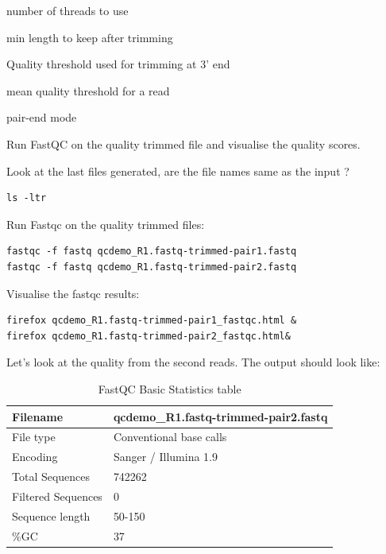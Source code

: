 \begin{note}
\begin{description}[style=multiline,labelindent=0cm,align=right,leftmargin=\descriptionlabelspace,rightmargin=1.5cm,font=\ttfamily]
\item[-t] number of threads to use
\item[-l] min length to keep after trimming
\item[-q] Quality threshold used for trimming at 3' end
\item[-Q] mean quality threshold for a read
\item[-m] pair-end mode
\end{description}
\end{note}

\begin{steps}
Run FastQC on the quality trimmed file and visualise the quality scores. 

Look at the last files generated, are the file names same as the input ?
\begin{lstlisting}
ls -ltr
\end{lstlisting}

Run Fastqc on the quality trimmed files:
\begin{lstlisting}
fastqc -f fastq qcdemo_R1.fastq-trimmed-pair1.fastq
fastqc -f fastq qcdemo_R1.fastq-trimmed-pair2.fastq
\end{lstlisting}

Visualise the fastqc results:
\begin{lstlisting}
firefox qcdemo_R1.fastq-trimmed-pair1_fastqc.html &
firefox qcdemo_R1.fastq-trimmed-pair2_fastqc.html&
\end{lstlisting}
Let's look at the quality from the second reads. The output should look like:

\begin{table}[H]
  \centering
  \caption{FastQC Basic Statistics table}
    \begin{tabular}{ll}
    \toprule
    Filename & qcdemo\_R1.fastq-trimmed-pair2.fastq\\
    \midrule
    File type & Conventional base calls\\
    Encoding & Sanger / Illumina 1.9\\
    Total Sequences & 742262\\
    Filtered Sequences & 0\\
    Sequence length & 50-150\\
    \%GC & 37\\
    \bottomrule
    \end{tabular}
  \label{tab:badexamplequalitytrimmed}
\end{table}


\end{steps}
